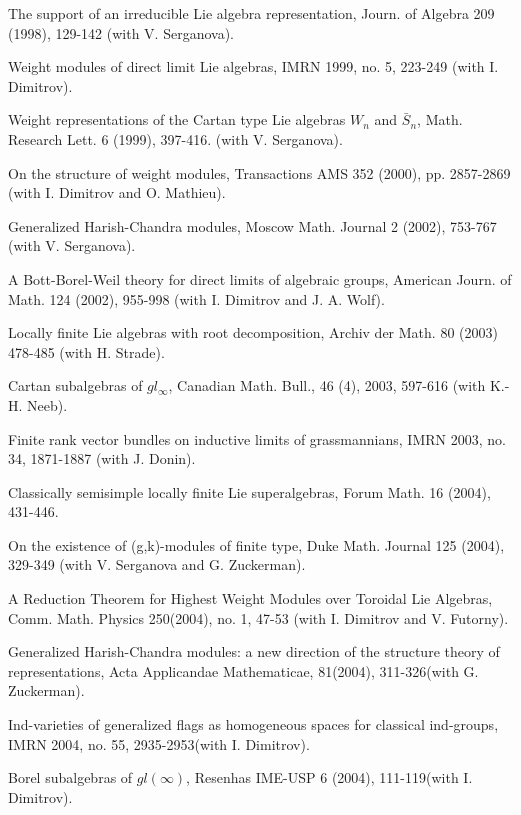 \documentclass[11pt]{amsart}
\begin{document}
\myss \label{26.}  The support of an irreducible Lie algebra
representation, Journ. of Algebra 209 (1998), 129-142 (with V.
Serganova).

\myss \label{27.} Weight modules of direct limit Lie algebras,
IMRN 1999, no. 5, 223-249  (with I. Dimitrov).

\myss \label{28.} Weight representations of the Cartan type Lie
algebras $W_n$ and $\bar{S}_n$, Math. Research Lett. 6 (1999),
397-416. (with V. Serganova).

\myss \label{29.}  On the structure of weight modules,
Transactions AMS 352 (2000), pp. 2857-2869 (with I. Dimitrov and O.
Mathieu).

\myss \label{30.} Generalized Harish-Chandra modules, Moscow Math.
Journal 2 (2002), 753-767 (with V. Serganova).

\myss \label{31.} A Bott-Borel-Weil theory for direct limits of
algebraic groups, American Journ. of Math.  124 (2002), 955-998
(with I. Dimitrov and J. A. Wolf).

\myss \label{32.} Locally finite Lie algebras with root
decomposition, Archiv der Math. 80 (2003) 478-485 (with H.
Strade).

\myss \label{33.} Cartan subalgebras of $gl_{\infty}$, Canadian Math.
Bull., 46 (4), 2003, 597-616 (with K.-H. Neeb).

\myss \label{34.} Finite rank vector bundles on inductive limits of
grassmannians, IMRN 2003, no. 34, 1871-1887  (with J. Donin).

\myss \label{35.} Classically semisimple locally finite Lie
superalgebras, Forum Math. 16 (2004), 431-446.

\myss \label{36.} On the existence of (g,k)-modules of finite
type, Duke Math. Journal 125 (2004), 329-349
(with V. Serganova and G. Zuckerman).

\myss \label{37.} A Reduction Theorem for Highest Weight Modules
over Toroidal Lie Algebras, Comm. Math. Physics 250(2004), no. 1, 47-53 (with I. Dimitrov and V. Futorny).

\myss \label{38.} Generalized Harish-Chandra modules: a new direction of
the structure theory of representations, Acta Applicandae Mathematicae,
81(2004), 311-326(with G. Zuckerman).

\myss \label{39.} Ind-varieties of generalized flags as homogeneous
spaces for classical ind-groups, IMRN 2004, no. 55, 2935-2953(with I. Dimitrov).

\myss \label{40.} Borel subalgebras of $gl(\infty)$, Resenhas IME-USP 6 (2004), 111-119(with I. Dimitrov).
\end{document}
